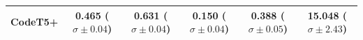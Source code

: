 \documentclass[11pt]{article}
\begin{document}
\begin{table}[htbp]
{\begin{tabular}{|c|c|c|c|c|c|}
CodeT5+ & \makecell{0.465\\ ($\sigma \pm 0.04$)} & \makecell{0.631\\ ($\sigma \pm 0.04$)} & \makecell{0.150\\ ($\sigma \pm 0.04$)} & \makecell{0.388\\ ($\sigma \pm 0.05$)} & \makecell{15.048\\ ($\sigma \pm 2.43$)} \\\hline
\end{tabular}
}
\end{table}
\end{document}
